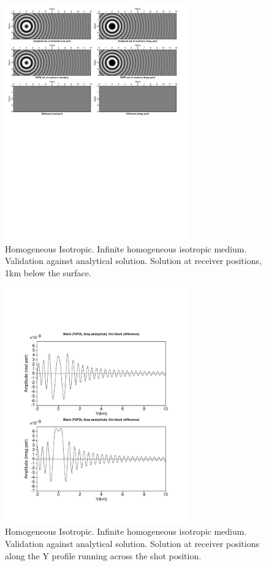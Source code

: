 \begin{figure}[]
\centering 
\includegraphics[width=0.7\textwidth]{images/fig_dsfdm/fig_rec_snap_homogeneous_isotropic.pdf}
\caption{Homogeneous Isotropic.  Infinite homogeneous isotropic medium. Validation against analytical
solution. Solution at receiver positions, 1km below the surface.}
\label{rec_snap_homogeneous_isotropic} 
\end{figure}
\begin{figure}[]
\centering 
\includegraphics[width=0.7\textwidth]{images/fig_dsfdm/fig_rec_log_homogeneous_isotropic.pdf}
\caption{Homogeneous Isotropic. Infinite homogeneous isotropic medium. Validation against analytical
solution. Solution at receiver positions along the Y profile running across the shot position.}
\label{rec_log_homogeneous_isotropic} 
\end{figure}

